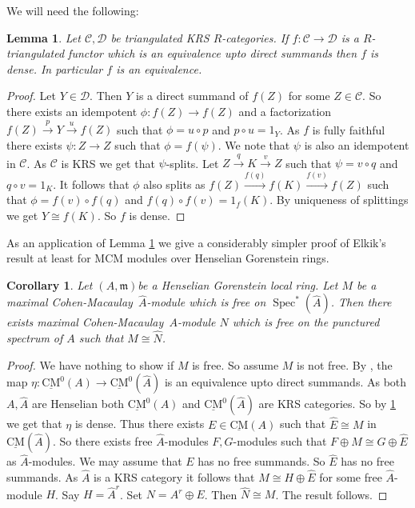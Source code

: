 \documentclass{amsart}
\newcommand{\CM}{Cohen-Macaulay}
\newcommand{\D}{\mathcal{D} }
\newcommand{\m}{\mathfrak{m} }
\newcommand{\C}{\mathcal{C}}
\newcommand{\rt}{\rightarrow}
\newcommand{\wh}{\widehat }
\newcommand{\Spec}{\operatorname{Spec}}
\newcommand{\CMS}{\operatorname{\underline{CM}}}
\theoremstyle{plain}
\newtheorem{corollary}[theorem]{Corollary}
\newtheorem{lemma}[theorem]{Lemma}
\theoremstyle{definition}
\theoremstyle{remark}
\begin{document}
{We will need the following:
\begin{lemma}
\label{krs-equi}
Let  $\C, \D$ be triangulated KRS $R$-categories. If $f \colon \C \rt \D$ is a $R$-triangulated functor which is an equivalence upto direct summands then $f$ is dense. In particular $f$ is an equivalence.
\end{lemma}
\begin{proof}
Let $Y \in \D$. Then $Y$ is a direct summand of $f(Z)$ for some $Z \in \C$. So there exists
an idempotent $\phi \colon f(Z) \rt f(Z)$ and a factorization $f(Z) \xrightarrow{p} Y \xrightarrow{u} f(Z)$ such that $\phi = u\circ p$ and $p\circ u = 1_Y$. As $f$ is fully faithful there exists $\psi \colon Z \rt Z$ such that $\phi = f(\psi)$. We note that $\psi$ is also an idempotent in $\C$. As $\C$ is KRS we get that $\psi$-splits. Let $Z \xrightarrow{q} K \xrightarrow{v} Z$ such that $\psi = v\circ q$ and $q\circ v = 1_K$.
It follows that $\phi$ also splits as $f(Z) \xrightarrow{f(q)} f(K) \xrightarrow{f(v)} f(Z)$ such that $\phi = f(v)\circ f(q)$ and $f(q)\circ f(v) = 1_f(K)$. By uniqueness of splittings
we get $Y \cong f(K)$. So $f$ is dense.
\end{proof}

As an application of Lemma \ref{krs-equi} we give a considerably simpler proof of Elkik's result \cite{E}  at least for MCM modules over Henselian Gorenstein rings.
\begin{corollary}
\label{elkik} Let $(A,\m)$be a Henselian  Gorenstein local ring. Let $M$ be a maximal \CM \ $\wh{A}$-module which is free on $\Spec^*(\wh{A})$. Then there exists maximal \CM \ $A$-module $N$ which is free on the punctured spectrum of $A$ such that $M \cong \wh{N}$.
\end{corollary}
\begin{proof}
We have nothing to show if $M$ is free. So assume $M$ is not free. By \cite[3.2]{T}, the map $\eta \colon \CMS^0(A) \rt \CMS^0(\wh{A})$ is an equivalence upto direct summands. As both $A, \wh{A}$ are Henselian both  $\CMS^0(A)$ and $ \CMS^0(\wh{A})$ are KRS categories. So by  \ref{krs-equi} we get that $\eta$ is dense. Thus there exists $E \in \CMS(A)$ such that $\wh{E} \cong M$ in $\CMS(\wh{A})$. So there exists free $\wh{A}$-modules $F, G$-modules such that $F \oplus M \cong G \oplus \wh{E}$ as $\wh{A}$-modules. We may assume that $E$ has no free summands. So $\wh{E}$  has no free summands. As $\wh{A}$ is a KRS category it follows that   $M \cong H\oplus \wh{E}$ for some free $\wh{A}$-module $H$. Say $H = \wh{A}^r$. Set
$N = A^r \oplus E$. Then $\wh{N} \cong M$. The result follows.
\end{proof}

}
\end{document}
